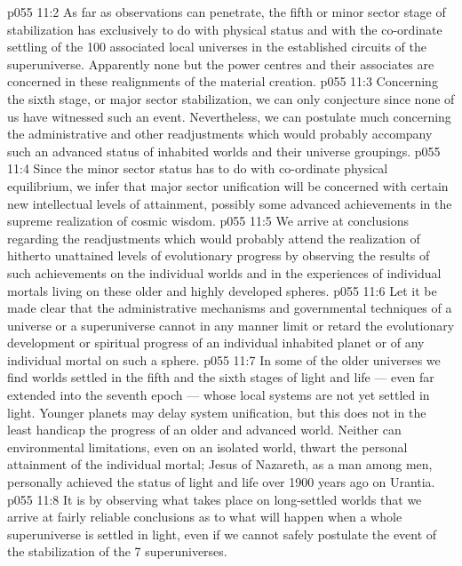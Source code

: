 \vs p055 11:2 \pc {} As far as observations can penetrate, the fifth or minor sector stage of stabilization has exclusively to do with physical status and with the co\hyp{}ordinate settling of the 100 associated local universes in the established circuits of the superuniverse. Apparently none but the power centres and their associates are concerned in these realignments of the material creation.
\vs p055 11:3 \pc {} Concerning the sixth stage, or major sector stabilization, we can only conjecture since none of us have witnessed such an event. Nevertheless, we can postulate much concerning the administrative and other readjustments which would probably accompany such an advanced status of inhabited worlds and their universe groupings.
\vs p055 11:4 Since the minor sector status has to do with co\hyp{}ordinate physical equilibrium, we infer that major sector unification will be concerned with certain new intellectual levels of attainment, possibly some advanced achievements in the supreme realization of cosmic wisdom.
\vs p055 11:5 \pc We arrive at conclusions regarding the readjustments which would probably attend the realization of hitherto unattained levels of evolutionary progress by observing the results of such achievements on the individual worlds and in the experiences of individual mortals living on these older and highly developed spheres.
\vs p055 11:6 Let it be made clear that the administrative mechanisms and governmental techniques of a universe or a superuniverse cannot in any manner limit or retard the evolutionary development or spiritual progress of an individual inhabited planet or of any individual mortal on such a sphere.
\vs p055 11:7 In some of the older universes we find worlds settled in the fifth and the sixth stages of light and life --- even far extended into the seventh epoch --- whose local systems are not yet settled in light. Younger planets may delay system unification, but this does not in the least handicap the progress of an older and advanced world. Neither can environmental limitations, even on an isolated world, thwart the personal attainment of the individual mortal; Jesus of Nazareth, as a man among men, personally achieved the status of light and life over 1900 years ago on Urantia.
\vs p055 11:8 It is by observing what takes place on long\hyp{}settled worlds that we arrive at fairly reliable conclusions as to what will happen when a whole superuniverse is settled in light, even if we cannot safely postulate the event of the stabilization of the 7 superuniverses.
